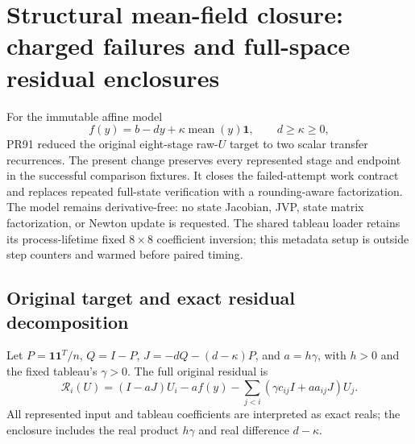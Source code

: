 \section{Structural mean-field closure: charged failures and full-space residual enclosures}
\label{sec:structural-production}

For the immutable affine model
\begin{equation}
 f(y)=b-dy+\kappa\operatorname{mean}(y)\mathbf1,
 \qquad d\ge\kappa\ge0,
\end{equation}
PR91 reduced the original eight-stage raw-$U$ target to two scalar transfer recurrences. The present change preserves every represented stage and endpoint in the successful comparison fixtures. It closes the failed-attempt work contract and replaces repeated full-state verification with a rounding-aware factorization. The model remains derivative-free: no state Jacobian, JVP, state matrix factorization, or Newton update is requested. The shared tableau loader retains its process-lifetime fixed $8\times8$ coefficient inversion; this metadata setup is outside step counters and warmed before paired timing.

\subsection{Original target and exact residual decomposition}
Let $P=\mathbf1\mathbf1^T/n$, $Q=I-P$, $J=-dQ-(d-\kappa)P$, and $a=h\gamma$, with $h>0$ and the fixed tableau's $\gamma>0$. The full original residual is
\begin{equation}
 \mathcal R_i(U)=(I-aJ)U_i-af(y)
 -\sum_{j<i}(\gamma c_{ij}I+a a_{ij}J)U_j.
\end{equation}
All represented input and tableau coefficients are interpreted as exact reals; the enclosure includes the real product $h\gamma$ and real difference $d-\kappa$.

